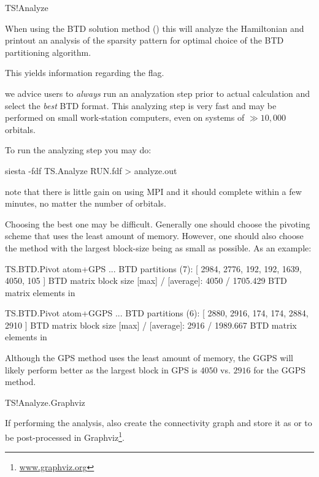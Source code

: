 \begin{fdflogicalF}{TS!Analyze}

  When using the BTD solution method () this
  will analyze the Hamiltonian and printout an analysis of the
  sparsity pattern for optimal choice of the BTD partitioning
  algorithm.

  This yields information regarding the  flag.

  \note we advice users to \emph{always} run an analyzation step prior
  to actual calculation and select the \emph{best} BTD format. This
  analyzing step is very fast and may be performed on small
  work-station computers, even on systems of $\gg10,000$ orbitals.

  To run the analyzing step you may do:
  \begin{shellexample}
    siesta -fdf TS.Analyze RUN.fdf > analyze.out
  \end{shellexample}
  note that there is little gain on using MPI and it should complete
  within a few minutes, no matter the number of orbitals.

  Choosing the best one may be difficult. Generally one should choose
  the pivoting scheme that uses the least amount of memory. However,
  one should also choose the method with the largest block-size being
  as small as possible. As an example:
  \begin{output}[fontsize=\footnotesize]
TS.BTD.Pivot atom+GPS
...
    BTD partitions (7): 
     [ 2984, 2776, 192, 192, 1639, 4050, 105 ]
    BTD matrix block size [max] / [average]: 4050 /   1705.429
    BTD matrix elements in %

TS.BTD.Pivot atom+GGPS
...
    BTD partitions (6): 
     [ 2880, 2916, 174, 174, 2884, 2910 ]
    BTD matrix block size [max] / [average]: 2916 /   1989.667
    BTD matrix elements in %

  \end{output}
  Although the GPS method uses the least amount of memory, the GGPS
  will likely perform better as the largest block in GPS is $4050$
  vs. $2916$ for the GGPS method. 

\end{fdflogicalF}

\begin{fdflogicalF}{TS!Analyze.Graphviz}

  If performing the analysis, also create the connectivity graph and
  store it as  or 
  to be post-processed in Graphviz\footnote{\url{www.graphviz.org}}.
  
\end{fdflogicalF}

